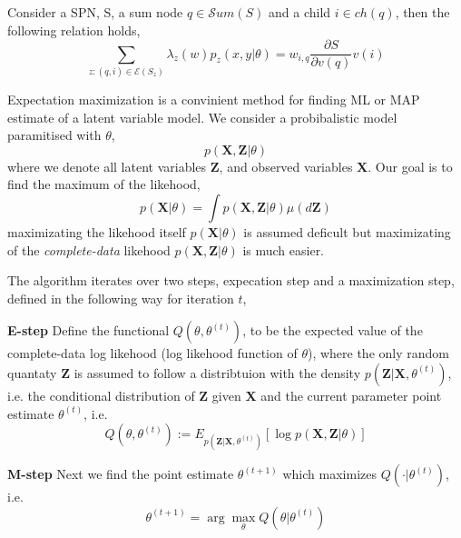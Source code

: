 \begin{proposition}
    Consider a SPN, S, a sum node $q \in \mathcal{S}um(S)$ and a child $i \in ch(q)$,
    then the following relation holds, 
    $$\sum_{z:(q,i)\in \mathcal{E}(S_z)} \lambda_z(w) p_z(x,y|\theta) = w_{i,q}
    \frac{\partial S}{\partial v(q)} v(i)$$
\end{proposition}


\begin{testexample2}
    Expectation maximization is a convinient method for finding ML or MAP estimate of a 
    latent variable model. We consider a probibalistic model paramitised with $\theta$, 
    $$p(\textbf{X}, \textbf{Z}|\theta)$$ 
    where we denote all latent variables \textbf{Z},
    and observed variables \textbf{X}. Our goal is to find the maximum of the
    likehood, 
    $$p(\textbf{X}|\theta) = \int p(\textbf{X}, \textbf{Z}| \theta) \mu(d\textbf{Z})$$
    maximizating the likehood itself $p(\textbf{X}|\theta)$ is assumed deficult 
    but maximizating of the \textit{complete-data} likehood $p(\textbf{X}, \textbf{Z}|\theta)$
    is much easier. 

    The algorithm iterates over two steps, expecation step and a maximization step, 
    defined in the following way for iteration $t$, 
    
    \textbf{E-step}
    Define the functional $Q(\theta,\theta^{(t)})$, to be the expected value of the complete-data 
    log likehood (log likehood function of $\theta$), where the only random quantaty $\textbf{Z}$
    is assumed to follow a distribtuion with the density $p(\textbf{Z}|\textbf{X}, \theta^{(t)})$,
    i.e. the conditional distribution of \textbf{Z} given \textbf{X} and the current parameter point estimate
    $\theta^{(t)}$, i.e. 
    $$Q(\theta,\theta^{(t)}) := E_{p(\textbf{Z}|\textbf{X}, \theta^{(t)})}[\log p(\textbf{X}, \textbf{Z}|\theta)]$$

    \textbf{M-step}
    Next we find the point estimate $\theta^{(t+1)}$ which maximizes $Q(\cdot|\theta^{(t)})$, i.e.
    $$\theta^{(t+1)} = \arg\max_{\theta} Q(\theta|\theta^{(t)})$$


\end{testexample2}
